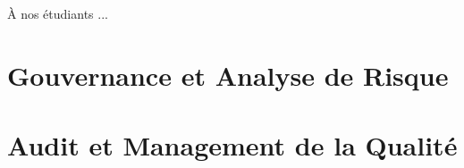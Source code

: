 \documentclass[12pt, a4paper, twoside, openright]{book}
\begin{document}
À nos étudiants ...

\clearpage\tableofcontents
\clearpage\listoffigures{}
\listoftables{}
\lstlistoflistings{}

\mainmatter






\clearpage
\clearpage
\part{Gouvernance et Analyse de Risque}








\clearpage
\clearpage
\part{Audit et Management de la Qualité}









\clearpage
\clearpage
\end{document}
